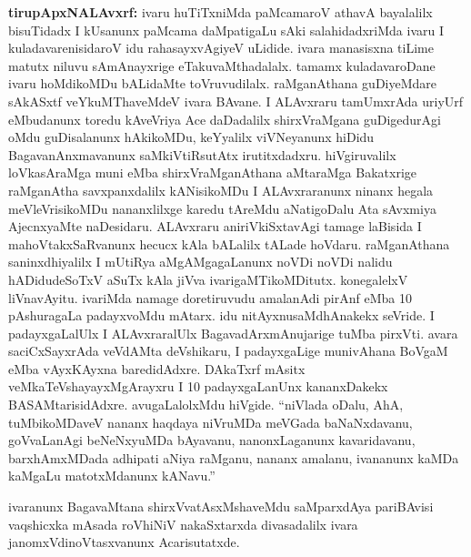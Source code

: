 {\large\textbf{tirupApxNALAvxrf:}} ivaru huTiTxniMda paMcamaroV athavA bayalalilx bisuTidadx I kUsanunx paMcama daMpatigaLu sAki salahidadxriMda ivaru I kuladavarenisidaroV idu rahasayxvAgiyeV uLidide. ivara manasisxna tiLime matutx niluvu sAmAnayxrige eTakuvaMthadalalx. tamamx kuladavaroDane ivaru hoMdikoMDu bALidaMte toVruvudilalx. raMganAthana guDiyeMdare sAkASxtf veYkuMThaveMdeV ivara BAvane. I ALAvxraru tamUmxrAda uriyUrf eMbudanunx toredu kAveVriya Ace daDadalilx shirxVraMgana guDigedurAgi oMdu guDisalanunx hAkikoMDu, keYyalilx viVNeyanunx hiDidu BagavanAnxmavanunx saMkiVtiRsutAtx irutitxdadxru. hiVgiruvalilx loVkasAraMga muni eMba shirxVraMganAthana aMtaraMga Bakatxrige raMganAtha savxpanxdalilx kANisikoMDu I ALAvxraranunx ninanx hegala meVleVrisikoMDu nananxlilxge karedu tAreMdu aNatigoDalu Ata sAvxmiya AjecnxyaMte naDesidaru. ALAvxraru aniriVkiSxtavAgi tamage laBisida I mahoVtakxSaRvanunx hecucx kAla bALalilx tALade hoVdaru. raMganAthana saninxdhiyalilx I mUtiRya aMgAMgagaLanunx noVDi noVDi nalidu hADidudeSoTxV aSuTx kAla jiVva ivarigaMTikoMDitutx. konegalelxV liVnavAyitu. ivariMda namage doretiruvudu amalanAdi pirAnf eMba {\rm 10} pAshuragaLa padayxvoMdu mAtarx. idu nitAyxnusaMdhAnakekx seVride. I padayxgaLalUlx I ALAvxraralUlx BagavadArxmAnujarige tuMba pirxVti. avara saciCxSayxrAda veVdAMta deVshikaru, I padayxgaLige munivAhana BoVgaM eMba vAyxKAyxna baredidAdxre. DAkaTxrf mAsitx veMkaTeVshayayxMgArayxru I {\rm 10} padayxgaLanUnx kananxDakekx BASAMtarisidAdxre. avugaLalolxMdu hiVgide. ``niVlada oDalu, AhA, tuMbikoMDaveV nananx haqdaya niVruMDa meVGada baNaNxdavanu, goVvaLanAgi beNeNxyuMDa bAyavanu, nanonxLaganunx kavaridavanu, barxhAmxMDada adhipati aNiya raMganu, nananx amalanu, ivananunx kaMDa kaMgaLu matotxMdanunx kANavu.''

ivaranunx BagavaMtana shirxVvatAsxMshaveMdu saMparxdAya pariBAvisi vaqshicxka mAsada roVhiNiV nakaSxtarxda divasadalilx ivara janomxVdinoVtasxvanunx Acarisutatxde.

